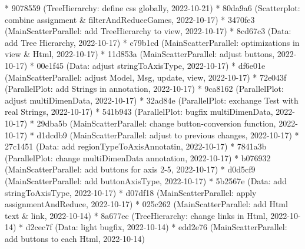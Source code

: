 \documentclass[usegeometry=true]{scrartcl}
\begin{document}
* 9078559 (TreeHierarchy: define css globally, 2022-10-21)\newline
* 80da9a6 (Scatterplot: combine assignment \& filterAndReduceGames, 2022-10-17)\newline
* 3470fe3 (MainScatterParallel: add TreeHierarchy to view, 2022-10-17)\newline
* 8cd67c3 (Data: add Tree Hierarchy, 2022-10-17)\newline
* c79b1cd (MainScatterParallel: optimizations in view \& Html, 2022-10-17) \newline
* 11d853a (MainScatterParallel: adjust buttons, 2022-10-17)\newline
* 00e1f45 (Data: adjust stringToAxisType, 2022-10-17)\newline
* df6e01e (MainScatterParallel: adjust Model, Msg, update, view, 2022-10-17) \newline
* 72e043f (ParallelPlot: add Strings in annotation, 2022-10-17)\newline
* 9ca8162 (ParallelPlot: adjust multiDimenData, 2022-10-17)\newline
* 32ad84e (ParallelPlot: exchange Test with real Strings, 2022-10-17)\newline
* 541b943 (ParallelPlot: bugfix multiDimenData, 2022-10-17)\newline
* 29dba5b (MainScatterParallel: change button-conversion function, 2022-10-17)\newline
* d1dcdb9 (MainScatterParallel: adjust to previous changes, 2022-10-17)\newline
* 27c1451 (Data: add regionTypeToAxisAnnotatin, 2022-10-17)\newline
* 7841a3b (ParallelPlot: change multiDimenData annotation, 2022-10-17)\newline
* b076932 (MainScatterParallel: add buttons for axis 2-5, 2022-10-17)\newline
* d0d5cf9 (MainScatterParallel: add buttonAxisType, 2022-10-17)\newline
* 5b2567e (Data: add stringToAxisType, 2022-10-17) \newline
* d07df18 (MainScatterParallel: apply assignmentAndReduce, 2022-10-17)\newline
* 025c262 (MainScatterParallel: add Html text \& link, 2022-10-14)\newline
* 8a677ec (TreeHierarchy: change links in Html, 2022-10-14)\newline
* d2cec7f (Data: light bugfix, 2022-10-14)\newline
* edd2e76 (MainScatterParallel: add buttons to each Html, 2022-10-14)\newline
\end{document}

